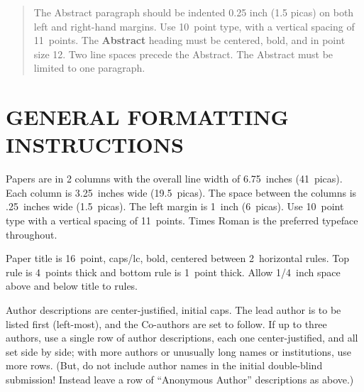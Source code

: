 \documentclass[twoside]{article}
\begin{document}
%

%


\begin{abstract}
  The Abstract paragraph should be indented 0.25 inch (1.5 picas) on
  both left and right-hand margins. Use 10~point type, with a vertical
  spacing of 11~points.  The {\bf Abstract} heading must be centered,
  bold, and in point size 12. Two line spaces precede the
  Abstract. The Abstract must be limited to one paragraph.
\end{abstract}

\section{GENERAL FORMATTING INSTRUCTIONS}

Papers are in 2 columns with the overall line width of 6.75~inches (41~picas). Each column is 3.25~inches wide (19.5~picas).  The space
between the columns is .25~inches wide (1.5~picas).  The left margin is 1~inch (6~picas).  Use 10~point type with a vertical spacing of
11~points. Times Roman is the preferred typeface throughout.

Paper title is 16~point, caps/lc, bold, centered between 2~horizontal rules.  Top rule is 4~points thick and bottom rule is 1~point thick.
Allow 1/4~inch space above and below title to rules.

Author descriptions are center-justified, initial caps.  The lead
author is to be listed first (left-most), and the Co-authors are set
to follow.  If up to three authors, use a single row of author
descriptions, each one center-justified, and all set side by side;
with more authors or unusually long names or institutions, use more
rows.  (But, do not include author names in the initial double-blind
submission!  Instead leave a row of ``Anonymous Author'' descriptions
as above.)
\end{document}
